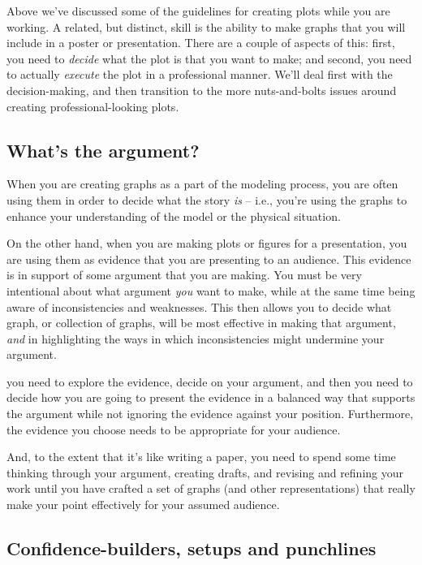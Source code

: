 \documentclass{tufte-handout}
\begin{document}
Above we've discussed some of the guidelines for creating plots while you are working.  A related, but distinct, skill is the ability to make graphs that you will include in a poster or presentation.  There are a couple of aspects of this:  first, you need to {\it decide} what the plot is that you want to make; and second, you need to actually {\it execute} the plot in a professional manner.  We'll deal first with the decision-making, and then transition to the more nuts-and-bolts issues around creating professional-looking plots.


\subsection{What's the argument?}

When you are creating graphs as a part of the modeling process, you are often using them in order to decide what the story {\it is} -- i.e., you're using the graphs to enhance your understanding of the model or the physical situation.

On the other hand, when you are making plots or figures for a presentation, you are using them as evidence that you are presenting to an audience.  This evidence is in support of some argument that you are making.  You must be very intentional about what argument {\it you} want to make, while at the same time being aware of inconsistencies and weaknesses.  This then allows you to decide what graph, or collection of graphs, will be most effective in making that argument, {\it and} in highlighting the ways in which inconsistencies might undermine your argument.

  you need to explore the evidence, decide on your argument, and then you need to decide how you are going to present the evidence in a balanced way that supports the argument while not ignoring the evidence against your position.  Furthermore, the evidence you choose needs to be appropriate for your audience.

And, to the extent that it's like writing a paper, you need to spend some time thinking through your argument, creating drafts, and revising and refining your work until you have crafted a set of graphs (and other representations) that really make your point effectively for your assumed audience.  

\subsection{Confidence-builders, setups and punchlines}
\end{document}
